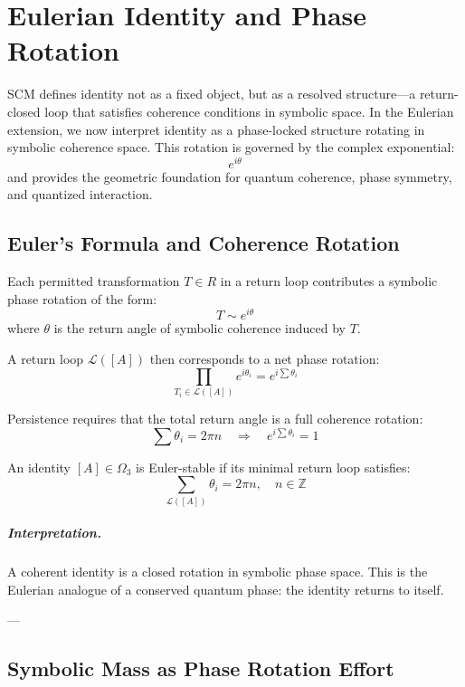 \chapter{Eulerian Identity and Phase Rotation} \label{chapter:euler-identity}

SCM defines identity not as a fixed object, but as a resolved structure—a return-closed loop that satisfies coherence conditions in symbolic space. In the Eulerian extension, we now interpret identity as a phase-locked structure rotating in symbolic coherence space. This rotation is governed by the complex exponential:
\[
e^{i\theta}
\]
and provides the geometric foundation for quantum coherence, phase symmetry, and quantized interaction.

\section{Euler's Formula and Coherence Rotation}

\begin{definition}
Each permitted transformation $T \in R$ in a return loop contributes a symbolic phase rotation of the form:
\[
T \sim e^{i\theta}
\]
where $\theta$ is the return angle of symbolic coherence induced by $T$.
\end{definition}

A return loop $\mathcal{L}([A])$ then corresponds to a net phase rotation:
\[
\prod_{T_i \in \mathcal{L}([A])} e^{i\theta_i} = e^{i\sum \theta_i}
\]

Persistence requires that the total return angle is a full coherence rotation:
\[
\sum \theta_i = 2\pi n \quad \Rightarrow \quad e^{i\sum \theta_i} = 1
\]

\begin{definition}
An identity $[A] \in \Omega_3$ is Euler-stable if its minimal return loop satisfies:
\[
\sum_{\mathcal{L}([A])} \theta_i = 2\pi n,\quad n \in \mathbb{Z}
\]
\end{definition}

\paragraph{Interpretation.}  
A coherent identity is a closed rotation in symbolic phase space. This is the Eulerian analogue of a conserved quantum phase: the identity returns to itself.

---

\section{Symbolic Mass as Phase Rotation Effort}

